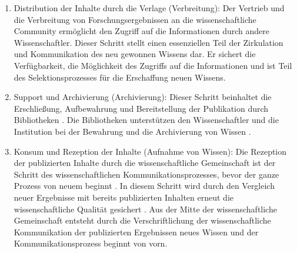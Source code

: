 \begin{enumerate}
\begin{end}
\begin{enumerate}
\item Distribution der Inhalte durch die Verlage (Verbreitung):
Der Vertrieb und die Verbreitung von Forschungsergebnissen an die wissenschaftliche Community ermöglicht den Zugriff auf die Informationen durch andere Wissenschaftler. Dieser Schritt stellt einen essenziellen Teil der Zirkulation und Kommunikation des neu gewonnen Wissens dar\cite{cite:11i}. Er sichert die Verfügbarkeit, die Möglichkeit des Zugriffs auf die Informationen und ist Teil des Selektionsprozesses für die Erschaffung neuen Wissens.\cite{cite:11l}
\item Support und Archivierung (Archivierung): Dieser Schritt beinhaltet die Erschließung, Aufbewahrung und Bereitstellung der Publikation durch Bibliotheken \cite{schirmbacher_2009_wisspub}. Die Bibliotheken unterstützen den Wissenschaftler und die Institution bei der Bewahrung und die Archivierung von Wissen \cite{K_lbel_2002}.
\item Konsum und Rezeption der Inhalte (Aufnahme von Wissen): Die Rezeption der publizierten Inhalte durch die wissenschaftliche Gemeinschaft ist der  Schritt des wissenschaftlichen Kommunikationsprozesses, bevor der ganze Prozess von neuem beginnt \cite{schirmbacher_2009_wisspub}. In diesem Schritt wird durch den Vergleich neuer Ergebnisse mit bereits publizierten Inhalten erneut die wissenschaftliche Qualität gesichert \cite{umstatter_2007_qualitatssicherung}. Aus der Mitte der wissenschaftliche Gemeinschaft entsteht durch die Verschriftlichung der wissenschaftliche Kommunikation der publizierten Ergebnissen neues Wissen \cite{cite:11k} \cite{schirmbacher_2009_wisspub} und der Kommunikationsprozess beginnt von vorn.
\end{enumerate}


\end{end}
\end{enumerate}
